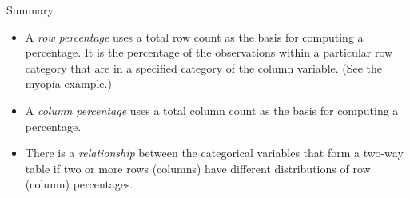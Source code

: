 \documentclass[Lecture.tex]{subfiles}
\begin{document}
\begin{frame}{Summary}
\begin{itemize}
\item<1->
A {\it row percentage} uses a total row count as the basis for computing a percentage.  It is the percentage of the observations within a particular row category that are in a specified category of the column variable. (See the myopia example.)
\item<2->
A {\it column percentage} uses a total column count as the basis for computing a percentage.
\item<3->
There is a {\it relationship} between the categorical variables that form a two-way table if two or more rows (columns) have different distributions of row (column) percentages.
\end{itemize}
\end{frame}  
  
  

  
  
  
  
  
  
  
  
  
  
  
  
  
  
  
  
\end{document}

